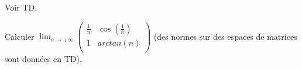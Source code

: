 \documentclass[a4paper,10pt]{report}
\begin{document}
\begin{Demonstration}{} Voir TD.
\end{Demonstration}

%
%
%
%
%
%
%
%
%
%
%

\begin{ApplicationDirecte} Calculer $\lim_{n \rightarrow + \infty} \begin{pmatrix}
\frac{1}{n} & \cos \left( \frac{1}{n} \right) \\
1 & arctan(n) \\
\end{pmatrix}$ (des normes sur des espaces de matrices sont données en TD).
\end{ApplicationDirecte}
\end{document}
